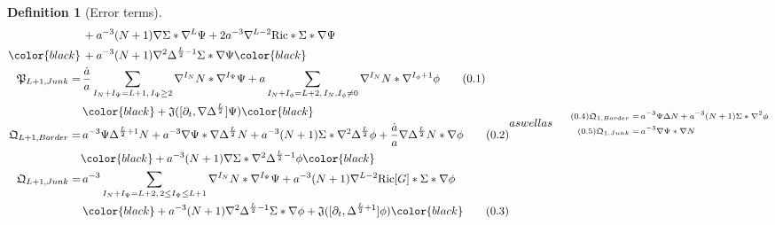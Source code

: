 \documentclass[11pt,leqno,textwidth=10cm]{amsart}
\numberwithin{equation}{section}
\theoremstyle{definition}
\newtheorem{definition}{Definition}[section]
\theoremstyle{plain}
\newcommand{\1}{\mathbbm{1}}
\newcommand{\Ric}{\text{\normalfont{Ric}}}
\newcommand{\del}{\partial}
\newcommand{\Lap}{\Delta}
\newcommand{\numberthis}{\addtocounter{equation}{1}\tag{\theequation}}
\renewcommand{\theequation}{\arabic{section}.\arabic{equation}}
\newcommand{\change}[1]{\color{black}#1\color{black}}
\newcommand{\deletemath}[1]{}
\begin{document}
\begin{definition}[Error terms]
\begin{subequations}
{\begin{align*}
&\,+a^{-3}(N+1)\nabla\Sigma\ast\nabla^L\Psi+2a^{-3}\nabla^{L-2}\Ric\ast\Sigma\ast\nabla\Psi\\
\change{&\,+a^{-3}(N+1)\nabla^2\Lap^{\frac{L}2-1}\Sigma\ast\nabla\Psi}\\
\mathfrak{P}_{L+1,Junk}=&\,\frac{\dot{a}}a\sum_{I_N+I_\Psi=L+1,\,I_\Psi\geq 2}\nabla^{I_N}N\ast\nabla^{I_\Psi}\Psi+a\sum_{I_N+I_\phi=L+2,\,I_N,I_\phi\neq 0}\nabla^{I_N}N\ast\nabla^{I_\phi+1}\phi \numberthis\label{eq:comeq-Psi-odd-junk}\\
&\,%
\change{+\mathfrak{J}([\del_t,\nabla\Lap^\frac{L}2]\Psi)}\\
\mathfrak{Q}_{L+1,Border}=&\,a^{-3}\Psi\Lap^{\frac{L}2+1}N+a^{-3}\nabla\Psi\ast\nabla\Lap^{\frac{L}2}N+a^{-3}(N+1)\Sigma\ast\nabla^2\Lap^{\frac{L}2}\phi+\frac{\dot{a}}a\nabla\Lap^\frac{L}2N\ast\nabla\phi\numberthis\label{eq:comeq-Q-odd-border}\\
&\change{+a^{-3}(N+1)\nabla\Sigma\ast\nabla^2\Lap^{\frac{L}2-1}\phi}\\
\mathfrak{Q}_{L+1,Junk}=&\,a^{-3}\sum_{I_N+I_\Psi=L+2,\,2\leq I_\Psi\leq L+1}\nabla^{I_N}N\ast\nabla^{I_\Psi}\Psi+a^{-3}(N+1)\nabla^{L-2}\Ric[G]\ast\Sigma\ast\nabla\phi\\
&\,%
\change{+a^{-3}(N+1)\nabla^2\Lap^{\frac{L}2-1}\Sigma\ast\nabla\phi+\mathfrak{J}([\del_t,\Lap^{\frac{L}2+1}]\phi)}\numberthis\label{eq:comeq-Q-odd-junk}
\end{align*}}
as well as
{\scriptsize \begin{align*}
\numberthis\label{eq:comeq-Q-1-border}\mathfrak{Q}_{1,Border}=&\,a^{-3}\Psi\Lap N+a^{-3}(N+1)\Sigma\ast\nabla^2\phi\deletemath{+a^{-3}(N+1)(\Psi+C)\nabla\phi\ast\nabla\phi}\\
\numberthis\label{eq:comeq-Q-1-junk}\mathfrak{Q}_{1,Junk}=&\,a^{-3}\nabla\Psi\ast\nabla N%

\end{align*}}
\end{subequations}
\end{definition}
\end{document}
